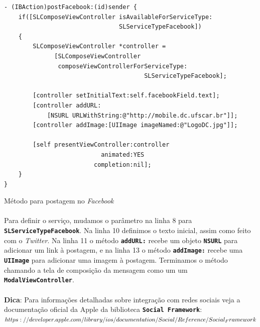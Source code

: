 \documentclass[a4paper,12pt,brazil,doubleside]{book}
\begin{document}
\begin{singlespace}
\begin{listing}[H]
\begin{verbatim}
- (IBAction)postFacebook:(id)sender {
    if([SLComposeViewController isAvailableForServiceType:
                                SLServiceTypeFacebook])
    {
        SLComposeViewController *controller =
              [SLComposeViewController
               composeViewControllerForServiceType:
                                       SLServiceTypeFacebook];
        
        [controller setInitialText:self.facebookField.text];
        [controller addURL:
            [NSURL URLWithString:@"http://mobile.dc.ufscar.br"]];
        [controller addImage:[UIImage imageNamed:@"LogoDC.jpg"]];

        [self presentViewController:controller
                           animated:YES
                         completion:nil];
    }
}
\end{verbatim}
\caption{Método para postagem no \emph{Facebook}}
\end{listing}

\paragraph{}Para definir o serviço, mudamos o parâmetro na linha 8 para \texttt{\textbf{SLServiceTypeFacebook}}. Na linha 10 definimos o texto inicial, assim como feito com o \emph{Twitter}. Na linha 11 o método \texttt{\textbf{addURL:}} recebe um objeto \texttt{\textbf{NSURL}} para adicionar um link à postagem, e na linha 13 o método \texttt{\textbf{addImage:}} recebe uma \texttt{\textbf{UIImage}} para adicionar uma imagem à postagem. Terminamos o método chamando a tela de composição da mensagem como um um \texttt{\textbf{ModalViewController}}.

\bigskip

\begin{framed}
\paragraph{}\textbf{Dica}: Para informações detalhadas sobre integração com redes sociais veja a documentação oficial da Apple da biblioteca \texttt{\textbf{Social Framework}}:\\
\(https://developer.apple.com/library/ios/documentation/Social/Reference/\\Social_Framework\)
\end{framed}


\end{singlespace}
\end{document}
